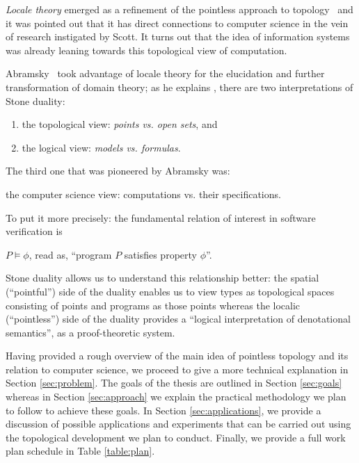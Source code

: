 \documentclass{article}
\begin{document}
\emph{Locale theory} emerged as a refinement of the pointless approach to topology~\cite{
johnstone:1982} and it was pointed out that it has direct connections to computer
science in the vein of research instigated by Scott. It turns out that the idea of
information systems was already leaning towards this topological view of computation.


Abramsky~\cite{abramsky:1991} took advantage of locale theory for the elucidation and
further transformation of domain theory; as he explains \cite{abramsky:1991}, there are
two interpretations of Stone duality:
\begin{enumerate}
  \item the topological view: \emph{points vs. open sets}, and
  \item the logical view: \emph{models vs. formulas}.
\end{enumerate}
The third one that was pioneered by Abramsky was:
\begin{center}
  the computer science view: computations vs. their specifications.
\end{center}

To put it more precisely: the fundamental relation of interest in software verification is

\begin{center}
  $P \vDash \phi$, \qquad read as, \qquad ``program $P$ satisfies property $\phi$''.
\end{center}

Stone duality allows us to understand this relationship better: the spatial (``pointful'')
side of the duality enables us to view types as topological spaces consisting of points
and programs as those points whereas the localic (``pointless'') side of the duality
provides a ``logical interpretation of denotational semantics'', as a proof-theoretic
system.

Having provided a rough overview of the main idea of pointless topology and its relation
to computer science, we proceed to give a more technical explanation in Section
\ref{sec:problem}. The goals of the thesis are outlined in Section \ref{sec:goals} whereas
in Section \ref{sec:approach} we explain the practical methodology we plan to follow to
achieve these goals. In Section \ref{sec:applications}, we provide a discussion of
possible applications and experiments that can be carried out using the topological
development we plan to conduct. Finally, we provide a full work plan schedule in Table
\ref{table:plan}.
\end{document}
